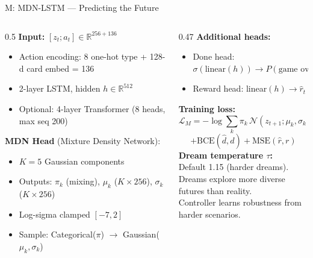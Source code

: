 \documentclass[aspectratio=169, 10pt]{beamer}
\begin{document}
\begin{frame}{M: MDN-LSTM --- Predicting the Future}
  \begin{columns}[T]
    \begin{column}{0.5\textwidth}
      \footnotesize
      \textbf{Input:} $[z_t; a_t] \in \mathbb{R}^{256+136}$
      \begin{itemize}\scriptsize
        \item Action encoding: 8 one-hot type + 128-d card embed = 136
        \item 2-layer LSTM, hidden $h \in \mathbb{R}^{512}$
        \item Optional: 4-layer Transformer (8 heads, max seq 200)
      \end{itemize}
      \vspace{0.15cm}
      \textbf{MDN Head} (Mixture Density Network):
      \begin{itemize}\scriptsize
        \item $K = 5$ Gaussian components
        \item Outputs: $\pi_k$ (mixing), $\mu_k$ ($K \times 256$), $\sigma_k$ ($K \times 256$)
        \item Log-sigma clamped $[-7, 2]$
        \item Sample: Categorical($\pi$) $\to$ Gaussian($\mu_k, \sigma_k$)
      \end{itemize}
    \end{column}
    \begin{column}{0.47\textwidth}
      \footnotesize
      \textbf{Additional heads:}
      \begin{itemize}\scriptsize
        \item Done head: $\sigma(\text{linear}(h)) \to P(\text{game over})$
        \item Reward head: linear$(h) \to \hat{r}_t$
      \end{itemize}
      \vspace{0.15cm}
      \textbf{Training loss:}
      $$\mathcal{L}_M = -\log\sum_k \pi_k \, \mathcal{N}(z_{t+1}; \mu_k, \sigma_k)$$
      $$+ \text{BCE}(\hat{d}, d) + \text{MSE}(\hat{r}, r)$$
      \vspace{0.15cm}
      \textbf{Dream temperature $\tau$:}\\
      Default 1.15 (harder dreams).\\
      Dreams explore more diverse futures than reality.\\
      Controller learns robustness from harder scenarios.
    \end{column}
  \end{columns}
\end{frame}
\end{document}
